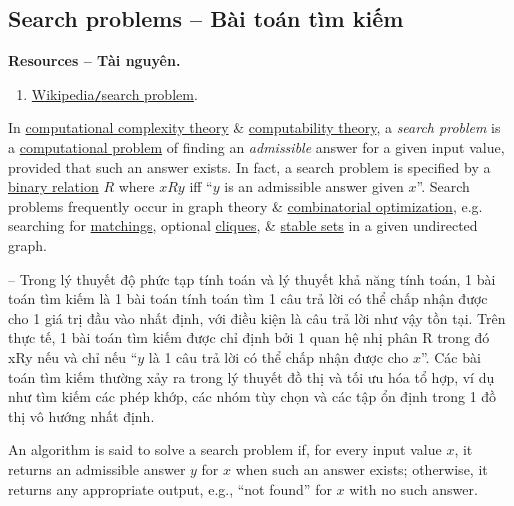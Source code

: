 \documentclass{article}
\begin{document}
\subsection{Search problems -- Bài toán tìm kiếm}
\textbf{\textsf{Resources -- Tài nguyên.}}
\begin{enumerate}
	\item \href{https://en.wikipedia.org/wiki/Search_problem}{Wikipedia{\tt/}search problem}.
\end{enumerate}
In \href{https://en.wikipedia.org/wiki/Computational_complexity_theory}{computational complexity theory} \& \href{https://en.wikipedia.org/wiki/Computability_theory}{computability theory}, a {\it search problem} is a \href{https://en.wikipedia.org/wiki/Computational_problem}{computational problem} of finding an {\it admissible} answer for a given input value, provided that such an answer exists. In fact, a search problem is specified by a \href{https://en.wikipedia.org/wiki/Binary_relation}{binary relation} $R$ where $xRy$ iff ``$y$ is an admissible answer given $x$''. Search problems frequently occur in graph theory \& \href{https://en.wikipedia.org/wiki/Combinatorial_optimization}{combinatorial optimization}, e.g. searching for \href{https://en.wikipedia.org/wiki/Matching_(graph_theory)}{matchings}, optional \href{https://en.wikipedia.org/wiki/Clique_(graph_theory)}{cliques}, \& \href{https://en.wikipedia.org/wiki/Independent_set_(graph_theory)}{stable sets} in a given undirected graph.

-- Trong lý thuyết độ phức tạp tính toán và lý thuyết khả năng tính toán, 1 bài toán tìm kiếm là 1 bài toán tính toán tìm 1 câu trả lời có thể chấp nhận được cho 1 giá trị đầu vào nhất định, với điều kiện là câu trả lời như vậy tồn tại. Trên thực tế, 1 bài toán tìm kiếm được chỉ định bởi 1 quan hệ nhị phân R trong đó xRy nếu và chỉ nếu ``$y$ là 1 câu trả lời có thể chấp nhận được cho $x$''. Các bài toán tìm kiếm thường xảy ra trong lý thuyết đồ thị và tối ưu hóa tổ hợp, ví dụ như tìm kiếm các phép khớp, các nhóm tùy chọn và các tập ổn định trong 1 đồ thị vô hướng nhất định.

An algorithm is said to solve a search problem if, for every input value $x$, it returns an admissible answer $y$ for $x$ when such an answer exists; otherwise, it returns any appropriate output, e.g., ``not found'' for $x$ with no such answer.
\end{document}
